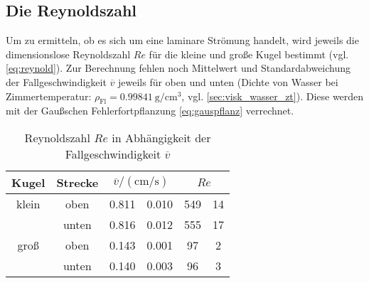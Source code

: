 \subsection[]{Die Reynoldszahl}
Um zu ermitteln, ob es sich um eine laminare Strömung handelt, wird jeweils die dimensionslose Reynoldszahl $Re$ für die kleine und große Kugel bestimmt
(vgl. \eqref{eq:reynold}).
Zur Berechnung fehlen noch Mittelwert und Standardabweichung der Fallgeschwindigkeit $\overline{v}$ jeweils für oben und unten
(Dichte von Wasser bei Zimmertemperatur: $\rho_\text{Fl} = \qty{0.99841}{\g \per \cm^3}$, vgl. \ref{sec:visk_wasser_zt}).
Diese werden mit der Gaußschen Fehlerfortpflanzung \eqref{eq:gauspflanz} verrechnet.

\begin{table}
    \caption[]{Reynoldszahl $Re$ in Abhängigkeit der Fallgeschwindigkeit $\overline{v}$}
    \label{tab:reynold}
    \centering
    \begin{tabular}[]{S S S @{${}\pm{}$} S S[table-format=3.0] @{${}\pm{}$} S[table-format=2.0]}
        \toprule
        {Kugel} & {Strecke} &  &  \\
        \bottomrule
        {klein} & {oben} & 0.811 & 0.010 & 549 & 14 \\
         & {unten} & 0.816 & 0.012 & 555 & 17 \\
        {groß} & {oben} & 0.143 & 0.001 & 97 & 2 \\
         & {unten} & 0.140 & 0.003 & 96 & 3 \\
    \end{tabular}
\end{table}


